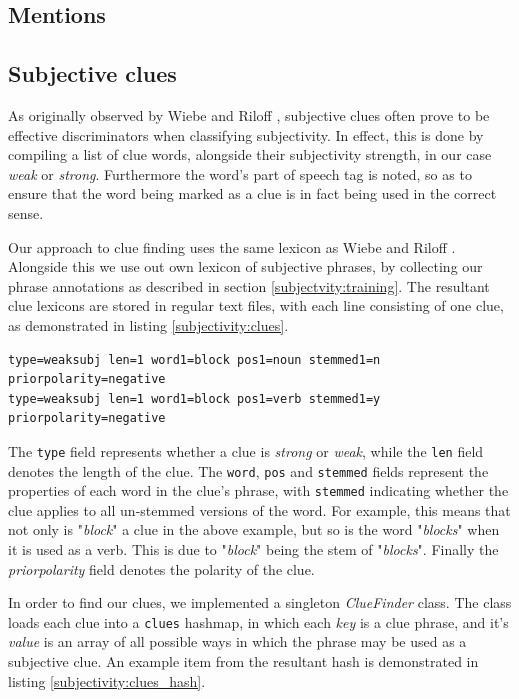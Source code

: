 \subsection{Mentions}

\subsection{Subjective clues}

As originally observed by Wiebe and Riloff \cite{Wiebe:2000ub}, subjective clues often prove to be effective discriminators when classifying subjectivity. In effect, this is done by compiling a list of clue words, alongside their subjectivity strength, in our case \emph{weak} or \emph{strong}. Furthermore the word's part of speech tag is noted, so as to ensure that the word being marked as a clue is in fact being used in the correct sense.

Our approach to clue finding uses the same lexicon as Wiebe and Riloff \cite{Wiebe:2000ub}. Alongside this we use out own lexicon of subjective phrases, by collecting our phrase annotations as described in section \ref{subjectvity:training}. The resultant clue lexicons are stored in regular text files, with each line consisting of one clue, as demonstrated in listing \ref{subjectivity:clues}.

\begin{lstlisting}[numbers=none, caption={Example clue from the subjective clue lexicon}, label=subjectivity:clues]
type=weaksubj len=1 word1=block pos1=noun stemmed1=n priorpolarity=negative
type=weaksubj len=1 word1=block pos1=verb stemmed1=y priorpolarity=negative
\end{lstlisting}

The \texttt{type} field represents whether a clue is \emph{strong} or \emph{weak}, while the \texttt{len} field denotes the length of the clue. The \texttt{word}, \texttt{pos} and \texttt{stemmed} fields represent the properties of each word in the clue's phrase, with \texttt{stemmed} indicating whether the clue applies to all un-stemmed versions of the word. For example, this means that not only is "\emph{block}" a clue in the above example, but so is the word "\emph{blocks}" when it is used as a verb. This is due to "\emph{block}" being the stem of "\emph{blocks}". Finally the \emph{priorpolarity} field denotes the polarity of the clue.

In order to find our clues, we implemented a singleton \emph{ClueFinder} class. The class loads each clue into a \texttt{clues} hashmap, in which each \emph{key} is a clue phrase, and it's \emph{value} is an array of all possible ways in which the phrase may be used as a subjective clue. An example item from the resultant hash is demonstrated in listing \ref{subjectivity:clues_hash}.

